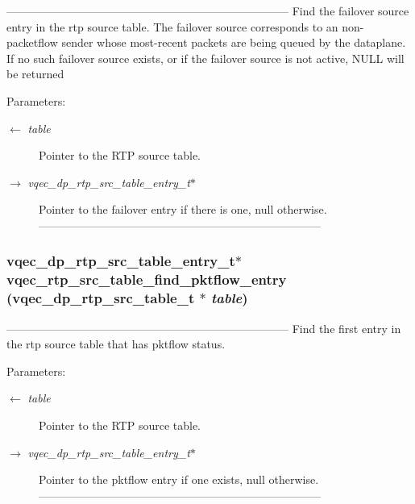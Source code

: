--------------------------------------------------------------------------- Find the failover source entry in the rtp source table. The failover source corresponds to an non-packetflow sender whose most-recent packets are being queued by the dataplane. If no such failover source exists, or if the failover source is not active, NULL will be returned

\begin{Desc}
\item[Parameters:]
\begin{description}
\item[\mbox{$\leftarrow$} {\em table}]Pointer to the RTP source table. \item[\mbox{$\rightarrow$} {\em vqec\_\-dp\_\-rtp\_\-src\_\-table\_\-entry\_\-t$\ast$}]Pointer to the failover entry if there is one, null otherwise. --------------------------------------------------------------------------- \end{description}
\end{Desc}
\subsubsection{\setlength{\rightskip}{0pt plus 5cm}vqec\_\-dp\_\-rtp\_\-src\_\-table\_\-entry\_\-t$\ast$ vqec\_\-rtp\_\-src\_\-table\_\-find\_\-pktflow\_\-entry (vqec\_\-dp\_\-rtp\_\-src\_\-table\_\-t $\ast$ {\em table})}\label{vqec__rtp_8c_fc26268188d656d4079859e4044881c0}


--------------------------------------------------------------------------- Find the first entry in the rtp source table that has pktflow status.

\begin{Desc}
\item[Parameters:]
\begin{description}
\item[\mbox{$\leftarrow$} {\em table}]Pointer to the RTP source table. \item[\mbox{$\rightarrow$} {\em vqec\_\-dp\_\-rtp\_\-src\_\-table\_\-entry\_\-t$\ast$}]Pointer to the pktflow entry if one exists, null otherwise. --------------------------------------------------------------------------- \end{description}
\end{Desc}
